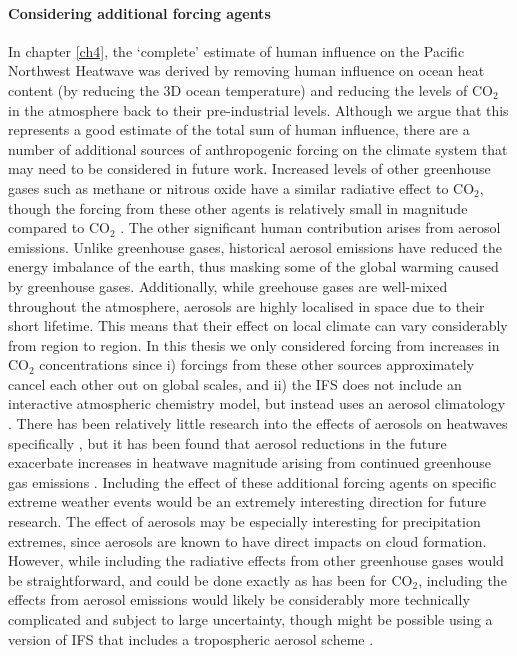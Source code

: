   \paragraph*{Considering additional forcing agents}

    In chapter \ref{ch4}, the `complete' estimate of human influence on the Pacific Northwest Heatwave was derived by removing human influence on ocean heat content (by reducing the 3D ocean temperature) and reducing the levels of CO$_2$ in the atmosphere back to their pre-industrial levels. Although we argue that this represents a good estimate of the total sum of human influence, there are a number of additional sources of anthropogenic forcing on the climate system that may need to be considered in future work. Increased levels of other greenhouse gases such as methane or nitrous oxide have a similar radiative effect to CO$_2$, though the forcing from these other agents is relatively small in magnitude compared to CO$_2$ \citep{masson-delmotte_earths_2021}. The other significant human contribution arises from aerosol emissions. Unlike greenhouse gases, historical aerosol emissions have reduced the energy imbalance of the earth, thus masking some of the global warming caused by greenhouse gases. Additionally, while greehouse gases are well-mixed throughout the atmosphere, aerosols are highly localised in space due to their short lifetime. This means that their effect on local climate can vary considerably from region to region. In this thesis we only considered forcing from increases in CO$_2$ concentrations since i) forcings from these other sources approximately cancel each other out on global scales, and ii) the IFS does not include an interactive atmospheric chemistry model, but instead uses an aerosol climatology \citep{bozzo_aerosol_2020}. There has been relatively little research into the effects of aerosols on heatwaves specifically \citep{horton_review_2016}, but it has been found that aerosol reductions in the future exacerbate increases in heatwave magnitude arising from continued greenhouse gas emissions \citep{zhao_strong_2019}. Including the effect of these additional forcing agents on specific extreme weather events would be an extremely interesting direction for future research. The effect of aerosols may be especially interesting for precipitation extremes, since aerosols are known to have direct impacts on cloud formation. However, while including the radiative effects from other greenhouse gases would be straightforward, and could be done exactly as has been for CO$_2$, including the effects from aerosol emissions would likely be considerably more technically complicated and subject to large uncertainty, though might be possible using a version of IFS that includes a tropospheric aerosol scheme \citep{remy_description_2019}.

